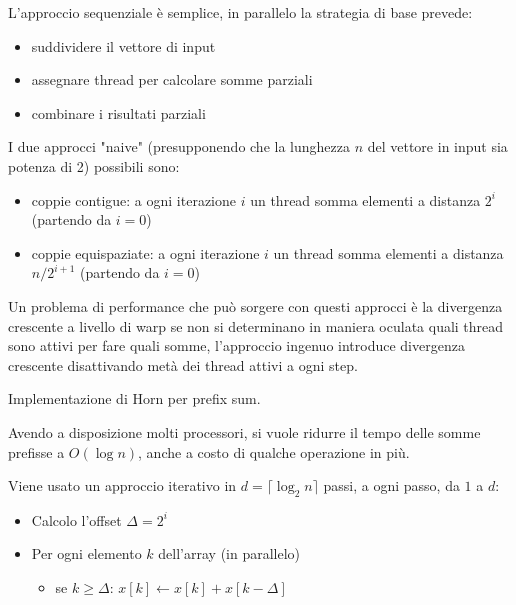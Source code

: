 \begin{questions}
\begin{solution}
        L'approccio sequenziale è semplice, in parallelo la strategia di base prevede: 
        \begin{itemize}
            \item suddividere il vettore di input
            
            \item assegnare thread per calcolare somme parziali
            
            \item combinare i risultati parziali
        \end{itemize}
        
        I due approcci "naive" (presupponendo che la lunghezza $n$ del vettore in input sia potenza di 2) possibili sono: 
        \begin{itemize}
            \item coppie contigue: a ogni iterazione $i$ un thread somma elementi a distanza $2^i$ (partendo da $i=0$)
            
            \item coppie equispaziate: a ogni iterazione $i$ un thread somma elementi a distanza $n/2^{i+1}$ (partendo da $i=0$)
        \end{itemize}
        
        Un problema di performance che può sorgere con questi approcci è la divergenza crescente a livello di warp se non si determinano in maniera oculata quali thread sono attivi per fare quali somme, l'approccio ingenuo introduce divergenza crescente disattivando metà dei thread attivi a ogni step.
    \end{solution}
    
    \question Implementazione di Horn per prefix sum.
    
    \begin{solution}
        Avendo a disposizione molti processori, si vuole ridurre il tempo delle somme prefisse a $O(\log n)$, anche a costo di qualche operazione in più.
        
        Viene usato un approccio iterativo in $d = \lceil \log_2 n \rceil$ passi, a ogni passo, da $1$ a $d$:
        \begin{itemize}
            \item Calcolo l'offset $\Delta = 2^i$
            
            \item Per ogni elemento $k$ dell'array (in parallelo)
            \begin{itemize}
                \item se $k \geq \Delta$: $x[k] \leftarrow x[k] + x[k - \Delta]$
                

\end{itemize}
\end{itemize}
\end{solution}
\end{questions}
